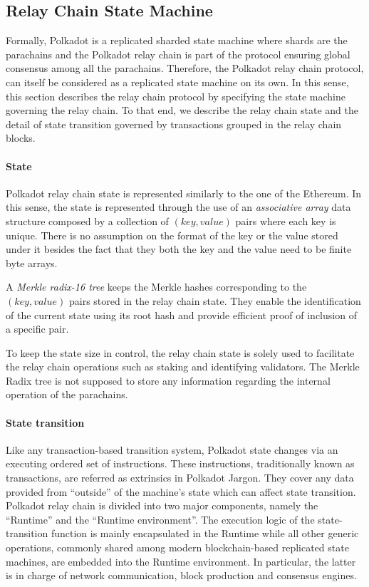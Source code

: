 \subsection{Relay Chain State Machine}\label{sec:relaychain}

Formally, Polkadot is a replicated sharded state machine where shards are the parachains and the Polkadot relay chain is part of the protocol ensuring global consensus among all the parachains. Therefore, the Polkadot relay chain protocol, can itself be considered as a replicated state machine on its own. In this sense, this section describes the relay chain protocol by specifying the state machine governing the relay chain. To that end, we describe the relay chain state and the detail of state transition governed by transactions grouped in the relay chain blocks.

\paragraph{State} Polkadot relay chain state is represented similarly to the one of the Ethereum. In this sense, the state is represented through the use of an \emph{associative array} data structure composed by a collection of $(key, value)$ pairs where each key is unique. There is no assumption on the format of the key or the value stored under it besides the fact that they both the key and the value need to be finite byte arrays.

A \emph{Merkle radix-16 tree} keeps the Merkle hashes corresponding to the $(key, value)$ pairs stored in the relay chain state. They enable the identification of the current state using its root hash and provide efficient
proof of inclusion of a specific pair.

To keep the state size in control, the relay chain state is solely used to facilitate the relay chain operations such as staking and identifying validators. The Merkle Radix tree is not supposed to store any information regarding the internal operation of the parachains.

\paragraph{State transition} Like any transaction-based transition system, Polkadot state changes via an executing ordered set of instructions. These instructions, traditionally known as transactions, are referred as extrinsics in Polkadot Jargon. They cover any data provided from ``outside'' of the machine's state which can affect state transition. Polkadot relay chain is divided into two major components, namely the ``Runtime'' and the ``Runtime environment''. The execution logic of the state-transition function is mainly encapsulated in the Runtime while all other generic operations, commonly shared among modern blockchain-based replicated state machines, are embedded into the Runtime environment. In particular, the latter is in charge of network communication, block production and consensus engines.

